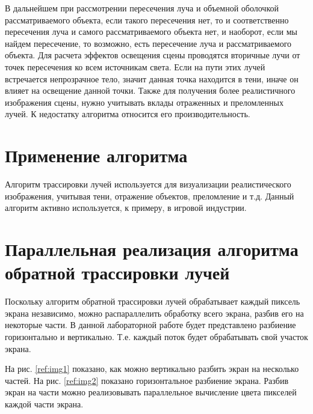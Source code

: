 В дальнейшем при рассмотрении пересечения луча и объемной оболочкой
рассматриваемого объекта, если такого пересечения нет, то и соответственно пере­сечения
луча и самого рассматриваемого объекта нет, и наоборот, если мы найдем
пересечение, то возможно, есть пересечение луча и рассматриваемого объекта. Для
расчета эффектов освещения сцены проводятся вторичные лучи от точек пересече­ния
ко всем источникам света. Если на пути этих лучей встречается непрозрачное
тело, значит данная точка находится в тени, иначе он влияет на освещение данной
точки. Также для получения более реалистичного изображения сцены, нужно учи­тывать
вклады отраженных и преломленных лучей.
К недостатку алгоритма относится его производительность.

\section{Применение алгоритма}

Алгоритм трассировки лучей используется для визуализации
реалистического изображения, учитывая тени, отражение объектов, преломление и т.д.
Данный алгоритм активно используется, к примеру, в игровой индустрии.

\section{Параллельная реализация алгоритма обратной трассировки лучей}

Поскольку алгоритм обратной трассировки лучей обрабатывает каждый пиксель
экрана независимо, можно распараллелить обработку всего экрана, разбив
его на некоторые части. В данной лабораторной работе будет представлено 
разбиение горизонтально и вертикально. Т.е. каждый поток будет обрабатывать
свой участок экрана. 

На рис. \ref{ref:img1} показано, как можно вертикально разбить экран на 
несколько частей. На рис. \ref{ref:img2} показано горизонтальное разбиение экрана.
Разбив экран на части можно реализовывать параллельное вычисление цвета 
пикселей каждой части экрана.

\begin{figure}[ht!]
\end{figure}


